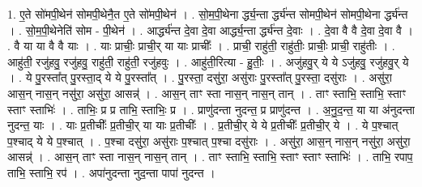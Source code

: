 \documentclass[17pt]{extarticle}
\begin{document}
1. ए॒ते सो॑मपी॒थेन॑ सोमपी॒थेनै॒त ए॒ते सो॑मपी॒थेन॑ । . सो॒म॒पी॒थेना र्द्ध्य॒न्ता र्द्ध्य॑न्त सोमपी॒थेन॑ सोमपी॒थेना र्द्ध्य॑न्त । . सो॒म॒पी॒थेनेति॑ सोम - पी॒थेन॑ । . आर्द्ध्य॑न्त दे॒वा दे॒वा आर्द्ध्य॒न्ता र्द्ध्य॑न्त दे॒वाः । . दे॒वा वै वै दे॒वा दे॒वा वै । . वै या या वै वै याः । . याः प्राचीः॒ प्राची॒र् या याः प्राचीः᳚ । . प्राची॒ राहु॑ती॒ राहु॑तीः॒ प्राचीः॒ प्राची॒ राहु॑तीः । . आहु॑ती॒ रजु॑हवु॒ रजु॑हवु॒ राहु॑ती॒ राहु॑ती॒ रजु॑हवुः । . आहु॑ती॒रित्या - हु॒तीः॒ । . अजु॑हवु॒र् ये ये ऽजु॑हवु॒ रजु॑हवु॒र् ये । . ये पु॒रस्ता᳚त् पु॒रस्ता॒द् ये ये पु॒रस्ता᳚त् । . पु॒रस्ता॒ दसु॑रा॒ असु॑राः पु॒रस्ता᳚त् पु॒रस्ता॒ दसु॑राः । . असु॑रा॒ आस॒न् नास॒न् नसु॑रा॒ असु॑रा॒ आसन्न्॑ । . आस॒न् ताꣳ स्ता नास॒न् नास॒न् तान् । . ताꣳ स्ताभि॒ स्ताभि॒ स्ताꣳ स्ताꣳ स्ताभिः॑ । . ताभिः॒ प्र प्र ताभि॒ स्ताभिः॒ प्र । . प्राणु॑दन्ता नुदन्त॒ प्र प्राणु॑दन्त । . अ॒नु॒द॒न्त॒ या या अ॑नुदन्ता नुदन्त॒ याः । . याः प्र॒तीचीः᳚ प्र॒तीची॒र् या याः प्र॒तीचीः᳚ । . प्र॒तीची॒र् ये ये प्र॒तीचीः᳚ प्र॒तीची॒र् ये । . ये प॒श्चात् प॒श्चाद् ये ये प॒श्चात् । . प॒श्चा दसु॑रा॒ असु॑राः प॒श्चात् प॒श्चा दसु॑राः । . असु॑रा॒ आस॒न् नास॒न् नसु॑रा॒ असु॑रा॒ आसन्न्॑ । . आस॒न् ताꣳ स्ता नास॒न् नास॒न् तान् । . ताꣳ स्ताभि॒ स्ताभि॒ स्ताꣳ स्ताꣳ स्ताभिः॑ । . ताभि॒ रपाप॒ ताभि॒ स्ताभि॒ रप॑ । . अपा॑नुदन्ता नुद॒न्ता पापा॑ नुदन्त । \newline
\end{document}

